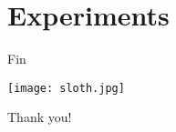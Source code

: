 \documentclass[xcolor=pdftex,t,11pt]{beamer}
\begin{document}
\section{Experiments}

\begin{frame}[fragile]{Fin}

\begin{center}
\texttt{[image: sloth.jpg]}

\Huge
 Thank you!
\end{center}

\end{frame}
\end{document}
